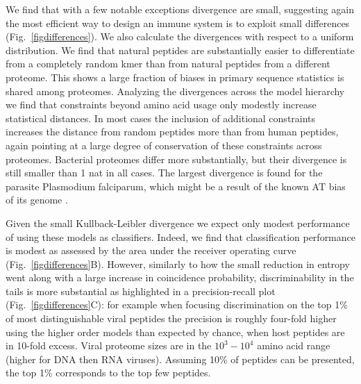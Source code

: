 \documentclass[superscriptaddress,twocolumn,pre]{revtex4}
\newcommand{\<}{\langle}
\renewcommand{\>}{\rangle}
\begin{document}
We find that with a few notable exceptions divergence are small, suggesting again the most efficient way to design an immune system is to exploit small differences (Fig.~\ref{figdifferences}). We also calculate the divergences with respect to a uniform distribution. We find that natural peptides are substantially easier to differentiate from a completely random kmer than from natural peptides from a different proteome. This shows a large fraction of biases in primary sequence statistics is shared among proteomes. Analyzing the divergences across the model hierarchy we find that constraints beyond amino acid usage only modestly increase statistical distances. In most cases the inclusion of additional constraints increases the distance from random peptides more than from human peptides, again pointing at a large degree of conservation of these constraints across proteomes. Bacterial proteomes differ more substantially, but their divergence is still smaller than 1 nat in all cases. The largest divergence is found for the parasite Plasmodium falciparum, which might be a result of the known AT bias of its genome \cite{Hamilton2017}.

Given the small Kullback-Leibler divergence we expect only modest performance of using these models as classifiers. Indeed, we find that classification performance is modest as assessed by the area under the receiver operating curve (Fig.~\ref{figdifferences}B). However, similarly to how the small reduction in entropy went along with a large increase in coincidence probability, discriminability in the tails is more substantial as highlighted in a precision-recall plot (Fig.~\ref{figdifferences}C): for example when focusing discrimination on the top 1\% of most distinguishable viral peptides the precision is roughly four-fold higher using the higher order models than expected by chance, when host peptides are in 10-fold excess. Viral proteome sizes are in the $10^3-10^4$ amino acid range (higher for DNA then RNA viruses). Assuming 10\% of peptides can be presented, the top 1\% corresponds to the top few peptides.



\end{document}

